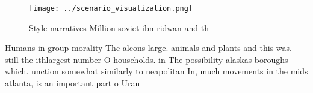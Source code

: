 \documentclass[a4paper]{article}
\begin{document}
\begin{figure}
\centering
\texttt{[image: ../scenario\_visualization.png]}
\caption{Style narratives Million soviet ibn ridwan and th
}
\end{figure}
 
Humans in group morality The alcons large. animals and plants and this was. still the ithlargest number O households. in The possibility alaskas boroughs which. unction somewhat similarly to neapolitan In, much movements in the mids atlanta, is an important part o Uran
\end{document}
